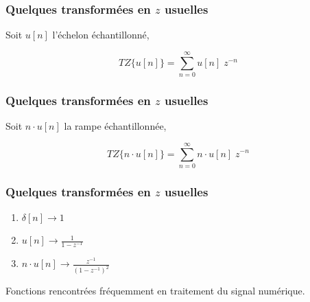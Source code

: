\documentclass{beamer}
\begin{document}
\begin{frame} 
\frametitle{Quelques transformées en $z$ usuelles}

Soit $u [n]$ l'échelon échantillonné,

\[TZ\{ u[n] \} = \sum_{n = 0}^{\infty} u[n] \; z^{-n}  \]

\vspace{0.3cm}
\end{frame} 

\begin{frame} 
\frametitle{Quelques transformées en $z$ usuelles}

Soit $n\cdot u [n]$ la rampe échantillonnée,

\[TZ\{ n\cdot u[n] \} = \sum_{n = 0}^{\infty} n \cdot u[n] \; z^{-n} \]

\vspace{0.3cm}


\end{frame}

%
%
%

\begin{frame}
\frametitle{Quelques transformées en $z$ usuelles}

\begin{enumerate}
\item $\delta[n] \rightarrow  1$ 
\vspace{0.3cm}
\item $u[n] \rightarrow \frac{\displaystyle 1}{ \displaystyle 1-z^{-1}}$
\vspace{0.3cm}
\item $n \cdot u[n] \rightarrow \frac{\displaystyle z^{-1}}{\displaystyle (1-z^{-1})^2} $
\vspace{0.3cm}
\end{enumerate} 
\vspace{0.5cm}

Fonctions rencontrées fréquemment en traitement du signal numérique.

\end{frame}
\end{document}
